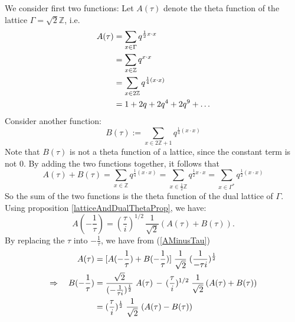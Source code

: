 \documentclass[12pt]{article}
\theoremstyle{definition}
\numberwithin{equation}{theorem}
\numberwithin{figure}{theorem}
\newcommand{\Integer}{\ensuremath{\mathbb{Z}}}
\newcommand{\imaginary}{\ensuremath{i}}
\begin{document}
We consider first two functions:
Let $A(\tau)$ denote the theta function of the lattice $\Gamma = \sqrt{2}\Integer$, i.e.
	\begin{align}
	A(\tau) &= \sum_{x \in \Gamma}q^{\frac{1}{2}x\cdot x} \notag\\
			&= \sum_{x \in \Integer}q^{x\cdot x} \notag\\
			&= \sum_{x \in 2\Integer}q^{\frac{1}{4}(x\cdot x)}\label{Afunc}\\
			&= 1 + 2q + 2q^4 + 2q^9 + \ldots \notag
	\end{align}
Consider another function:
\begin{equation}\label{Bfunc}
	B(\tau) := \sum_{x \in 2\Integer + 1}q^{\frac{1}{4}(x\cdot x)}
\end{equation}
Note that $B(\tau)$ is not a theta function of a lattice, since the constant term is not 0.
By adding the two functions together, it follows that
\begin{equation}\label{sumABfuncEq}
	A(\tau) + B(\tau) = \sum_{x \in \Integer}q^{\frac{1}{4}(x\cdot x)} = \sum_{x \in \frac{1}{2}\Integer}q^{\frac{1}{2}x \cdot x}
			= \sum_{x\in \Gamma^{*}}q^{\frac{1}{2}(x\cdot x)}
\end{equation}
So the sum of the two functions is the theta function of the dual lattice of $\Gamma$. Using proposition \ref{latticeAndDualThetaProp}, we have:
\begin{equation}\label{AMinusTau}
	A(-\frac{1}{\tau}) = (\frac{\tau}{\imaginary})^{1/2} \, \frac{1}{\sqrt{2}}(A(\tau) + B(\tau)).
\end{equation}
By replacing the $\tau$ into $-\frac{1}{\tau}$, we have from (\ref{AMinusTau})
\begin{align}
	A(\tau)&= [A(-\frac{1}{\tau}) + B(-\frac{1}{\tau})]\; \frac{1}{\sqrt{2}}\; (\frac{1}{-\tau \imaginary})^{\frac{1}{2}}  \notag \\
	\Rightarrow \quad B(-\frac{1}{\tau}) &= \frac{\sqrt{2}}{(-\frac{1}{\tau \imaginary})^{\frac{1}{2}}} \; A(\tau) \,- \,(\frac{\tau}{\imaginary})^{1/2} \; \frac{1}{\sqrt{2}}\,(A(\tau) + B(\tau))\notag\\
	&= (\frac{\tau}{\imaginary})^{\frac{1}{2}} \;\frac{1}{\sqrt{2}}\;(A(\tau) - B(\tau)) \label{BMinusTau}
\end{align}
\end{document}
